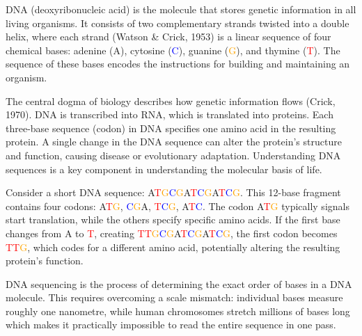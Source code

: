 DNA (deoxyribonucleic acid) is the molecule that stores genetic information in all living organisms. It consists of two complementary strands twisted into a double helix, where each strand (Watson \& Crick, 1953) is a linear sequence of four chemical bases: adenine (\textcolor{green!60!black}{A}), cytosine (\textcolor{blue}{C}), guanine (\textcolor{orange}{G}), and thymine (\textcolor{red}{T}). The sequence of these bases encodes the instructions for building and maintaining an organism.

The central dogma of biology describes how genetic information flows (Crick, 1970). DNA is transcribed into RNA, which is translated into proteins. Each three-base sequence (codon) in DNA specifies one amino acid in the resulting protein. A single change in the DNA sequence can alter the protein's structure and function, causing disease or evolutionary adaptation. Understanding DNA sequences is a key component in understanding the molecular basis of life.

Consider a short DNA sequence: \textcolor{green!60!black}{A}\textcolor{red}{T}\textcolor{orange}{G}\textcolor{blue}{C}\textcolor{orange}{G}\textcolor{green!60!black}{A}\textcolor{red}{T}\textcolor{blue}{C}\textcolor{orange}{G}\textcolor{green!60!black}{A}\textcolor{red}{T}\textcolor{blue}{C}\textcolor{orange}{G}. This 12-base fragment contains four codons: \textcolor{green!60!black}{A}\textcolor{red}{T}\textcolor{orange}{G}, \textcolor{blue}{C}\textcolor{orange}{G}\textcolor{green!60!black}{A}, \textcolor{red}{T}\textcolor{blue}{C}\textcolor{orange}{G}, \textcolor{green!60!black}{A}\textcolor{red}{T}\textcolor{blue}{C}. The codon \textcolor{green!60!black}{A}\textcolor{red}{T}\textcolor{orange}{G} typically signals \QSOpen{}start translation,\QSClose{} while the others specify specific amino acids. If the first base changes from \textcolor{green!60!black}{A} to \textcolor{red}{T}, creating \textcolor{red}{T}\textcolor{red}{T}\textcolor{orange}{G}\textcolor{blue}{C}\textcolor{orange}{G}\textcolor{green!60!black}{A}\textcolor{red}{T}\textcolor{blue}{C}\textcolor{orange}{G}\textcolor{green!60!black}{A}\textcolor{red}{T}\textcolor{blue}{C}\textcolor{orange}{G}, the first codon becomes \textcolor{red}{T}\textcolor{red}{T}\textcolor{orange}{G}, which codes for a different amino acid, potentially altering the resulting protein's function.

DNA sequencing is the process of determining the exact order of bases in a DNA molecule. This requires overcoming a scale mismatch: individual bases measure roughly one nanometre, while human chromosomes stretch millions of bases long which makes it practically impossible to read the entire sequence in one pass.

